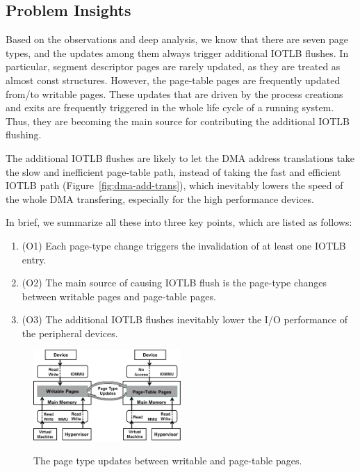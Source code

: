 \subsection{Problem Insights} \label{sec:insight}
Based on the observations and deep analysis, we know that there are seven page types, and the updates among them always trigger additional IOTLB flushes.
In particular, segment descriptor pages are rarely updated, as they are treated as almost const structures.
However, the page-table pages are frequently updated from/to writable pages.
These updates that are driven by the process creations and exits are frequently triggered in the whole life cycle of a running system.
Thus, they are becoming the main source for contributing the additional IOTLB flushing.

The additional IOTLB flushes are likely to let the DMA address
translations take the slow and inefficient page-table path,
instead of taking the fast and efficient IOTLB path (Figure~\ref{fig:dma-add-trans}), which inevitably lowers the
speed of the whole DMA transfering, especially for the high performance devices.


In brief, we summarize all these into three key points, which are listed as follows:
\begin{enumerate}
\item (O1) Each page-type change triggers the invalidation of at least one IOTLB entry.
\item (O2) The main source of causing IOTLB flush is the page-type changes between writable pages and page-table pages.
\item (O3) The additional IOTLB flushes inevitably lower the I/O performance of the peripheral devices.
\end{enumerate}

\begin{figure}[ht]
\centering
\includegraphics[width=0.5\textwidth]{image/background/wr2pt.png} \\
\caption{The page type updates between writable and page-table pages.}
\label{fig:wr2pt}
\end{figure}

